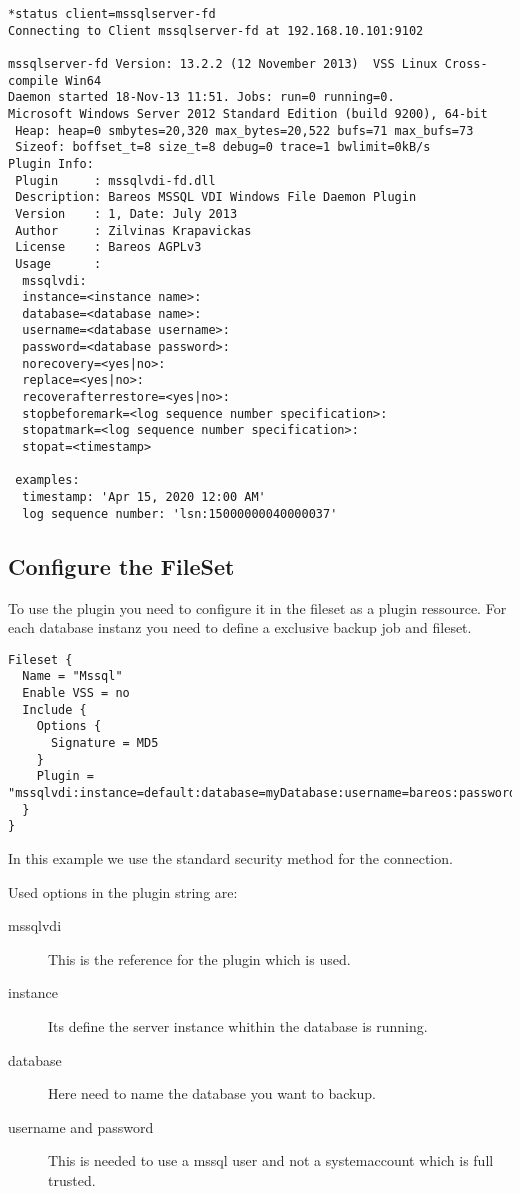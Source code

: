 \footnotesize
\begin{verbatim}
*status client=mssqlserver-fd
Connecting to Client mssqlserver-fd at 192.168.10.101:9102

mssqlserver-fd Version: 13.2.2 (12 November 2013)  VSS Linux Cross-compile Win64
Daemon started 18-Nov-13 11:51. Jobs: run=0 running=0.
Microsoft Windows Server 2012 Standard Edition (build 9200), 64-bit
 Heap: heap=0 smbytes=20,320 max_bytes=20,522 bufs=71 max_bufs=73
 Sizeof: boffset_t=8 size_t=8 debug=0 trace=1 bwlimit=0kB/s
Plugin Info:
 Plugin     : mssqlvdi-fd.dll
 Description: Bareos MSSQL VDI Windows File Daemon Plugin
 Version    : 1, Date: July 2013
 Author     : Zilvinas Krapavickas
 License    : Bareos AGPLv3
 Usage      :
  mssqlvdi:
  instance=<instance name>:
  database=<database name>:
  username=<database username>:
  password=<database password>:
  norecovery=<yes|no>:
  replace=<yes|no>:
  recoverafterrestore=<yes|no>:
  stopbeforemark=<log sequence number specification>:
  stopatmark=<log sequence number specification>:
  stopat=<timestamp>

 examples:
  timestamp: 'Apr 15, 2020 12:00 AM'
  log sequence number: 'lsn:15000000040000037'
\end{verbatim}
\normalsize

\subsection{Configure the FileSet}
\label{filesetconfig}
To use the plugin you need to configure it in the fileset as a plugin ressource. For each database instanz you need to define a exclusive backup job and fileset.

\footnotesize
\begin{verbatim}
Fileset {
  Name = "Mssql"
  Enable VSS = no
  Include {
    Options {
      Signature = MD5
    }
    Plugin = "mssqlvdi:instance=default:database=myDatabase:username=bareos:password=bareos"
  }
}
\end{verbatim}
\normalsize

In this example we use the standard security method for the connection.

Used options in the plugin string are:

\begin{description}
  \item[mssqlvdi]
  This is the reference for the plugin which is used.
  \item[instance]
  Its define the server instance whithin the database is running.
  \item[database]
  Here need to name the database you want to backup.
  \item[username and password]
  This is needed to use a mssql user and not a systemaccount which is full trusted.
\end{description}


